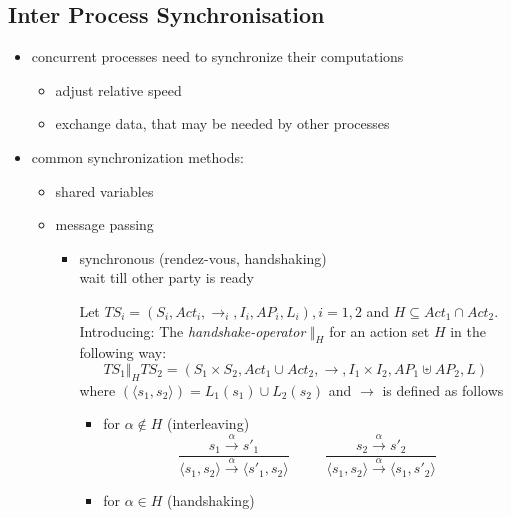 \documentclass[a4paper, 10pt]{article}
\begin{document}
\subsection*{Inter Process Synchronisation}
\begin{itemize}
    \item concurrent processes need to synchronize their computations
    \begin{itemize}
        \item adjust relative speed
        \item exchange data, that may be needed by other processes
    \end{itemize}
    \item common synchronization methods:
    \begin{itemize}
        \item shared variables
        \item message passing
        \begin{itemize}
            \item synchronous (rendez-vous, handshaking) \\
            wait till other party is ready
            \begin{shaded}
                Let $TS_i=(S_i,Act_i,\longrightarrow_i,I_i,AP_i,L_i), i=1,2$ and $H\subseteq Act_1\cap Act_2$. \\
                Introducing: The \emph{handshake-operator} $\Vert_H$ for an action set $H$ in the following way:
                \[ TS_1 \Vert_H TS_2 = (S_1\times S_2,Act_1\cup Act_2,\longrightarrow,I_1\times I_2, AP_1 \uplus AP_2,L) \]
                where $(\langle s_1,s_2\rangle) = L_1(s_1)\cup L_2(s_2)$ and $\longrightarrow$ is defined as follows
                \begin{itemize}
                    \item for $\alpha\not\in H$ (interleaving)
                    \[
                    \frac{
                    s_1 \overset{\alpha}{\longrightarrow} s'_1
                    }{
                    \langle s_1,s_2 \rangle \overset{\alpha}{\longrightarrow} \langle s'_1,s_2 \rangle
                    }
                    \phantom{\textrm{ and ·}}
                    \frac{
                    s_2 \overset{\alpha}{\longrightarrow} s'_2
                    }{
                    \langle s_1,s_2 \rangle \overset{\alpha}{\longrightarrow} \langle s_1,s'_2 \rangle
                    }
                    \]
                    \item for $\alpha\in H$ (handshaking)

\end{itemize}
\end{shaded}
\end{itemize}
\end{itemize}
\end{itemize}
\end{document}

